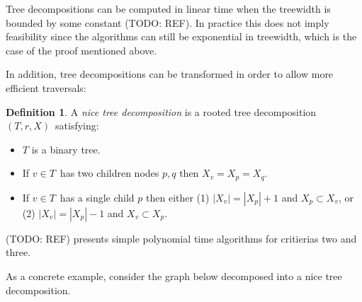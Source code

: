 \documentclass[a4paper,11pt,notitlepage]{report}
\theoremstyle{plain}
\theoremstyle{definition}
\newtheorem{defn}[thm]{Definition} %
\begin{document}
Tree decompositions can be computed in linear time when the treewidth is bounded by some constant (TODO: REF).
In practice this does not imply feasibility since the algorithms can still be exponential in treewidth, which is the case of the proof mentioned above.

In addition, tree decompositions can be transformed in order to allow more efficient traversals:

\begin{defn}
A \emph{nice tree decomposition} is a rooted tree decomposition $(T, r, X)$ satisfying:
\begin{itemize}
\item $T$ is a binary tree.
\item If $v \in T$ has two children nodes $p, q$ then $X_v = X_p = X_q$.
\item If $v \in T$ has a single child $p$ then either
  (1) $|X_v| = |X_p| + 1$ and $X_p \subset X_v$, or (2) $|X_v| = |X_p| - 1$ and $X_v \subset X_p$.
\end{itemize}
\end{defn}

(TODO: REF) presents simple polynomial time algorithms for critierias two and three.


As a concrete example, consider the graph below decomposed into a nice tree decomposition.
\end{document}
